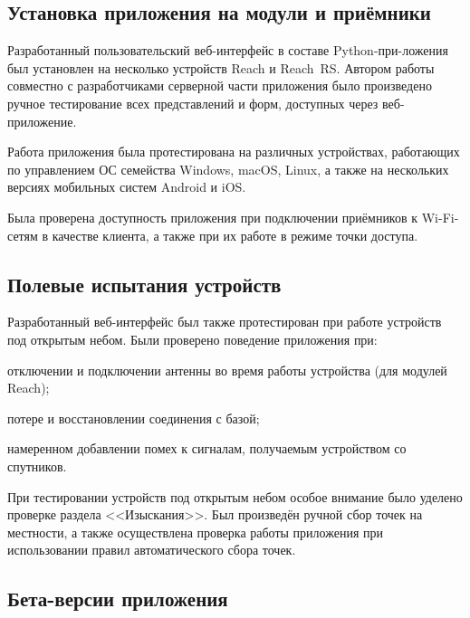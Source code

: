 
\subsection{Установка приложения на модули и приёмники}

Разработанный пользовательский веб-интерфейс в составе Python-при-ложения был установлен на несколько устройств Reach и Reach~RS. Автором работы совместно с разработчиками серверной части приложения было произведено ручное тестирование всех представлений и форм, доступных через веб-приложение.

Работа приложения была протестирована на различных устройствах, работающих по управлением ОС семейства Windows, macOS, Linux, а также на нескольких версиях мобильных систем Android и iOS.

Была проверена доступность приложения при подключении приёмников к Wi-Fi-сетям в качестве клиента, а также при их работе в режиме точки доступа.



\subsection{Полевые испытания устройств}

Разработанный веб-интерфейс был также протестирован при работе устройств под открытым небом. Были проверено поведение приложения при:
\begin{dashitemize}
  \item отключении и подключении антенны во время работы устройства (для модулей Reach);
  \item потере и восстановлении соединения с базой;
  \item намеренном добавлении помех к сигналам, получаемым устройством со спутников.
\end{dashitemize}

При тестировании устройств под открытым небом особое внимание было уделено проверке раздела <<Изыскания>>. Был произведён ручной сбор точек на местности, а также осуществлена проверка работы приложения при использовании правил автоматического сбора точек.



\subsection{Бета-версии приложения}

